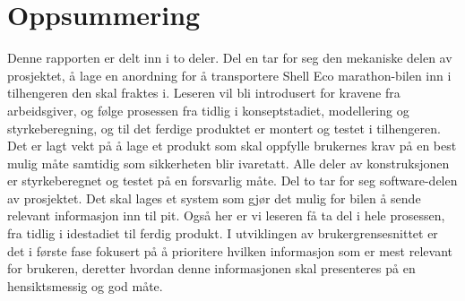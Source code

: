 \section*{\centering Oppsummering}
Denne rapporten er delt inn i to deler.\newline
Del en tar for seg den mekaniske delen av prosjektet, å lage en anordning for å transportere Shell Eco marathon-bilen inn i tilhengeren den skal fraktes i. Leseren vil bli introdusert for kravene fra arbeidsgiver, og følge prosessen fra tidlig i konseptstadiet, modellering og styrkeberegning, og til det ferdige produktet er montert og testet i tilhengeren. Det er lagt vekt på å lage et produkt som skal oppfylle brukernes krav på en best mulig måte samtidig som sikkerheten blir ivaretatt. Alle deler av konstruksjonen er styrkeberegnet og testet på en forsvarlig måte. \newline
Del to tar for seg software-delen av prosjektet. Det skal lages et system som gjør det mulig for bilen å sende relevant informasjon inn til pit. Også her er vi leseren få ta del i hele prosessen, fra tidlig i idestadiet til ferdig produkt. I utviklingen av brukergrensesnittet er det i første fase fokusert på å prioritere hvilken informasjon som er mest relevant for brukeren, deretter hvordan denne informasjonen skal presenteres på en hensiktsmessig og god måte.
